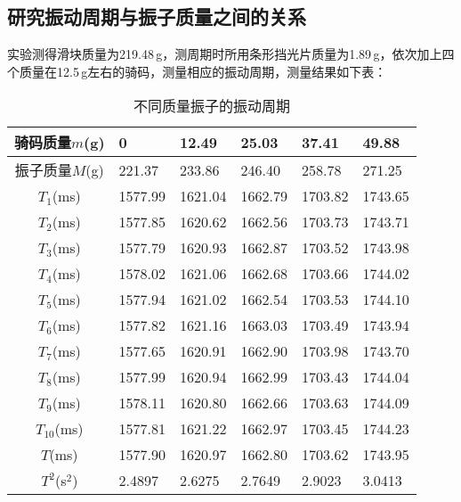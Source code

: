 \documentclass[UTF-8,twoside,cs4size]{ctexart}
\begin{document}
	\subsection{研究振动周期与振子质量之间的关系}\label{km}
	实验测得滑块质量为219.48\,g，测周期时所用条形挡光片质量为1.89\,g，依次加上四个质量在12.5\,g左右的骑码，测量相应的振动周期，测量结果如下表：
	\begin{table}[!h]
		\centering		
		\renewcommand\arraystretch{1.5}
		\begin{tabularx}{\textwidth}{|c|Y|Y|Y|Y|Y|}
			\hline
			骑码质量$ m $\;(g)&0&12.49&25.03&37.41&49.88\\
			\hline
			振子质量$ M $\;(g)&221.37&233.86&246.40&258.78&271.25\\
			\hline
			$ T_1 $\;(ms)&1577.99&1621.04&1662.79&1703.82&1743.65\\
			\hline
			$ T_2 $\;(ms)&1577.85&1620.62&1662.56&1703.73&1743.71\\
			\hline
			$ T_3 $\;(ms)&1577.79&1620.93&1662.87&1703.52&1743.98\\
			\hline
			$ T_4 $\;(ms)&1578.02&1621.06&1662.68&1703.66&1744.02\\
			\hline
			$ T_5 $\;(ms)&1577.94&1621.02&1662.54&1703.53&1744.10\\
			\hline
			$ T_6 $\;(ms)&1577.82&1621.16&1663.03&1703.49&1743.94\\
			\hline
			$ T_7 $\;(ms)&1577.65&1620.91&1662.90&1703.98&1743.70\\
			\hline
			$ T_8 $\;(ms)&1577.99&1620.94&1662.99&1703.43&1744.04\\
			\hline
			$ T_9 $\;(ms)&1578.11&1620.80&1662.66&1703.63&1744.09\\
			\hline
			$ T_{10} $\;(ms)&1577.81&1621.22&1662.97&1703.45&1744.23\\
			\hline
			$ T $\;(ms)&1577.90&1620.97&1662.80&1703.62&1743.95\\
			\hline
			$ T^2 $\;(s$ ^2 $)&2.4897&2.6275&2.7649&2.9023&3.0413\\
			\hline
		\end{tabularx}
		\caption{不同质量振子的振动周期}
	\end{table}
\end{document}
